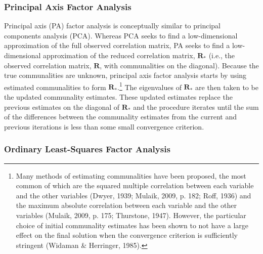 \documentclass[
  english,
  man]{apa6}
\begin{document}
\hypertarget{principal-axis-factor-analysis}{%
\subsubsection{Principal Axis Factor Analysis}\label{principal-axis-factor-analysis}}

Principal axis (PA) factor analysis is conceptually similar to principal components analysis (PCA). Whereas PCA seeks to find a low-dimensional approximation of the full observed correlation matrix, PA seeks to find a low-dimensional approximation of the reduced correlation matrix, \(\mathbf{R}_*\) (i.e., the observed correlation matrix, \(\mathbf{R}\), with communalities on the diagonal). Because the true communalities are unknown, principal axis factor analysis starts by using estimated communalities to form \(\mathbf{R}_*\).\footnote{Many methods of estimating communalities have been proposed, the most common of which are the squared multiple correlation between each variable and the other variables (Dwyer, 1939; Mulaik, 2009, p. 182; Roff, 1936) and the maximum absolute correlation between each variable and the other variables (Mulaik, 2009, p. 175; Thurstone, 1947). However, the particular choice of initial communality estimates has been shown to not have a large effect on the final solution when the convergence criterion is sufficiently stringent (Widaman \& Herringer, 1985).} The eigenvalues of \(\mathbf{R}_*\) are then taken to be the updated communality estimates. These updated estimates replace the previous estimates on the diagonal of \(\textbf{R}_*\) and the procedure iterates until the sum of the differences between the communality estimates from the current and previous iterations is less than some small convergence criterion.

\hypertarget{ordinary-least-squares-factor-analysis}{%
\subsubsection{Ordinary Least-Squares Factor Analysis}\label{ordinary-least-squares-factor-analysis}}
\end{document}
